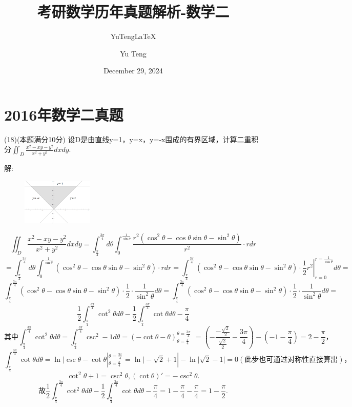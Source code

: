 \documentclass[lang=cn,10pt]{elegantbook}
\title{考研数学历年真题解析-数学二}
\subtitle{YuTeng\LaTeX{}}
\author{Yu Teng}
\institute{和光同尘}
\date{December 29, 2024}
\begin{document}
\maketitle
\frontmatter

\tableofcontents

\mainmatter

\chapter{2016年数学二真题}

(18)(本题满分10分)
设D是由直线y=1，y=x，y=-x围成的有界区域，计算二重积分$\iint_D{\frac{x^2-xy-y^2}{x^2+y^2}dxdy}$.

解: 
\begin{figure}[h]
    \centering
\includegraphics[width=0.3\textwidth]{image/2016数二-题18.png}
\end{figure}

$$
\iint_D{\frac{x^2-xy-y^2}{x^2+y^2}dxdy}=\int_{\frac{\pi}{4}}^{\frac{3\pi}{4}}{d\theta \int_0^{\frac{1}{\sin \theta}}{\frac{r^2\left( \cos ^2\theta -\cos \theta \sin \theta -\sin ^2\theta \right)}{r^2}\cdot rdr}}
$$
$$
=\int_{\frac{\pi}{4}}^{\frac{3\pi}{4}}{d\theta \int_0^{\frac{1}{\sin \theta}}{\left( \cos ^2\theta -\cos \theta \sin \theta -\sin ^2\theta \right) \cdot rdr}}=\int_{\frac{\pi}{4}}^{\frac{3\pi}{4}}{\left( \cos ^2\theta -\cos \theta \sin \theta -\sin ^2\theta \right) \cdot \left. \frac{1}{2}r^2 \right|_{r=0}^{r=\frac{1}{\sin \theta}}d\theta =}
$$
$$
\int_{\frac{\pi}{4}}^{\frac{3\pi}{4}}{\left( \cos ^2\theta -\cos \theta \sin \theta -\sin ^2\theta \right) \cdot \frac{1}{2}\cdot \frac{1}{\sin ^2\theta}d\theta}=\int_{\frac{\pi}{4}}^{\frac{3\pi}{4}}{\left( \cos ^2\theta -\cos \theta \sin \theta -\sin ^2\theta \right) \cdot \frac{1}{2}\cdot \frac{1}{\sin ^2\theta}d\theta}=
$$
$$
\frac{1}{2}\int_{\frac{\pi}{4}}^{\frac{3\pi}{4}}{\cot ^2\theta d\theta -\frac{1}{2}}\int_{\frac{\pi}{4}}^{\frac{3\pi}{4}}{\cot \theta d\theta -\frac{\pi}{4}}
$$
$$
\text{其中}\int_{\frac{\pi}{4}}^{\frac{3\pi}{4}}{\cot ^2\theta d\theta =}\int_{\frac{\pi}{4}}^{\frac{3\pi}{4}}{\csc ^2-1d\theta =}\left( -\cot \theta -\theta \right) _{\theta =\frac{\pi}{4}}^{\theta =\frac{3\pi}{4}}\,\,=\left( -\frac{-\frac{\sqrt{2}}{2}}{\frac{\sqrt{2}}{2}}-\frac{3\pi}{4} \right) -\left( -1-\frac{\pi}{4} \right) =2-\frac{\pi}{2}\text{，}
$$
$$
\int_{\frac{\pi}{4}}^{\frac{3\pi}{4}}{\cot \theta d\theta}=\ln\text{|}\csc \theta -\cot \theta |_{\theta =\frac{\pi}{4}}^{\theta =\frac{3\pi}{4}}=\ln\text{|}-\sqrt{2}+1|-\ln\text{|}\sqrt{2}-1|=0\left( \text{此步也可通过对称性直接算出} \right) \text{，}
$$
$$
\cot ^2\theta +1=\csc ^2\theta ,\left( \cot \theta \right) '=-\csc ^2\theta .
$$
$$
\text{故}\frac{1}{2}\int_{\frac{\pi}{4}}^{\frac{3\pi}{4}}{\cot ^2\theta d\theta -\frac{1}{2}}\int_{\frac{\pi}{4}}^{\frac{3\pi}{4}}{\cot \theta d\theta -\frac{\pi}{4}}=1-\frac{\pi}{4}-\frac{\pi}{4}=1-\frac{\pi}{2}.
$$
\end{document}
